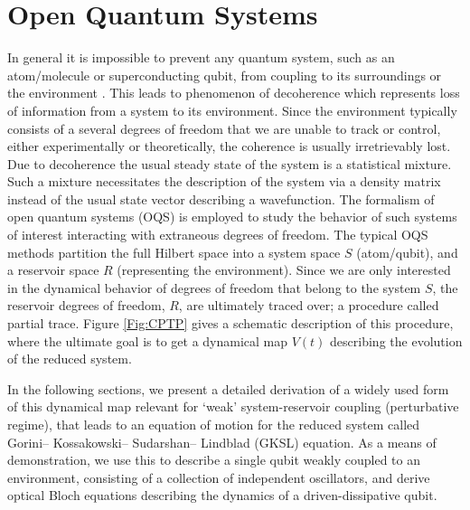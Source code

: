 \chapter{Open Quantum Systems}



%
In general it is impossible to prevent any quantum system, such as an atom/molecule or superconducting qubit, from coupling to its surroundings or the environment \cite{QuNoise}. This leads to phenomenon of decoherence which represents loss of information from a system to its environment. Since the environment typically consists of a several degrees of freedom that we are unable to track or control, either experimentally or theoretically, the coherence is usually irretrievably lost. Due to decoherence the usual steady state of the system is a statistical mixture. Such a mixture necessitates the description of the system via a density matrix instead of the usual state vector describing a wavefunction. The formalism of open quantum systems (OQS) is employed to study the behavior of such systems of interest interacting with extraneous degrees of freedom. The typical OQS methods partition the full Hilbert space into a system space $S$ (atom/qubit), and a reservoir space $R$ (representing the environment). Since we are only interested in the dynamical behavior of degrees of freedom that belong to the system $S$, the reservoir degrees of freedom, $R$, are ultimately traced over; a procedure called partial trace. Figure \ref{Fig:CPTP} gives a schematic description of this procedure, where the ultimate goal is to get a dynamical map $V(t)$ describing the evolution of the reduced system.
%
\par
%
In the following sections, we present a detailed derivation of a widely used form of this dynamical map relevant for `weak' system-reservoir coupling (perturbative regime), that leads to an equation of motion for the reduced system called Gorini– Kossakowski– Sudarshan– Lindblad (GKSL) equation. As a means of demonstration, we use this to describe a single qubit weakly coupled to an environment, consisting of a collection of independent oscillators, and derive optical Bloch equations describing the dynamics of a driven-dissipative qubit.

